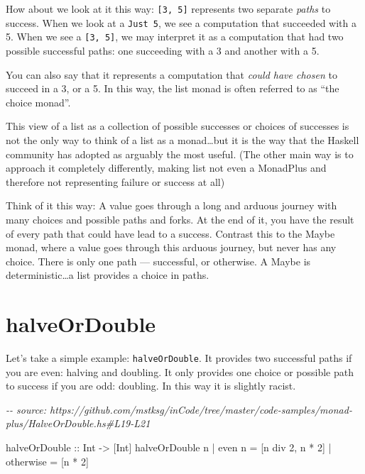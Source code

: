 \documentclass[]{article}
\newenvironment{Shaded}{}{}
\newcommand{\CommentTok}[1]{\textcolor[rgb]{0.38,0.63,0.69}{\textit{#1}}}
\newcommand{\DataTypeTok}[1]{\textcolor[rgb]{0.56,0.13,0.00}{#1}}
\newcommand{\DecValTok}[1]{\textcolor[rgb]{0.25,0.63,0.44}{#1}}
\newcommand{\FunctionTok}[1]{\textcolor[rgb]{0.02,0.16,0.49}{#1}}
\newcommand{\NormalTok}[1]{#1}
\newcommand{\OperatorTok}[1]{\textcolor[rgb]{0.40,0.40,0.40}{#1}}
\newcommand{\OtherTok}[1]{\textcolor[rgb]{0.00,0.44,0.13}{#1}}
\begin{document}
How about we look at it this way: \texttt{{[}3,\ 5{]}} represents two separate
\emph{paths} to success. When we look at a \texttt{Just\ 5}, we see a
computation that succeeded with a 5. When we see a \texttt{{[}3,\ 5{]}}, we may
interpret it as a computation that had two possible successful paths: one
succeeding with a 3 and another with a 5.

You can also say that it represents a computation that \emph{could have chosen}
to succeed in a 3, or a 5. In this way, the list monad is often referred to as
``the choice monad''.

This view of a list as a collection of possible successes or choices of
successes is not the only way to think of a list as a monad\ldots but it is the
way that the Haskell community has adopted as arguably the most useful. (The
other main way is to approach it completely differently, making list not even a
MonadPlus and therefore not representing failure or success at all)

Think of it this way: A value goes through a long and arduous journey with many
choices and possible paths and forks. At the end of it, you have the result of
every path that could have lead to a success. Contrast this to the Maybe monad,
where a value goes through this arduous journey, but never has any choice. There
is only one path --- successful, or otherwise. A Maybe is deterministic\ldots a
list provides a choice in paths.

\section{halveOrDouble}\label{halveordouble}

Let's take a simple example: \texttt{halveOrDouble}. It provides two successful
paths if you are even: halving and doubling. It only provides one choice or
possible path to success if you are odd: doubling. In this way it is slightly
racist.

\begin{Shaded}
\begin{Highlighting}[]
\CommentTok{{-}{-} source: https://github.com/mstksg/inCode/tree/master/code{-}samples/monad{-}plus/HalveOrDouble.hs\#L19{-}L21}

\OtherTok{halveOrDouble ::} \DataTypeTok{Int} \OtherTok{{-}\textgreater{}}\NormalTok{ [}\DataTypeTok{Int}\NormalTok{]}
\NormalTok{halveOrDouble n }\OperatorTok{|} \FunctionTok{even}\NormalTok{ n    }\OtherTok{=}\NormalTok{ [n }\OtherTok{\textasciigrave{}div\textasciigrave{}} \DecValTok{2}\NormalTok{, n }\OperatorTok{*} \DecValTok{2}\NormalTok{]}
                \OperatorTok{|} \FunctionTok{otherwise} \OtherTok{=}\NormalTok{ [n }\OperatorTok{*} \DecValTok{2}\NormalTok{]}
\end{Highlighting}
\end{Shaded}
\end{document}
